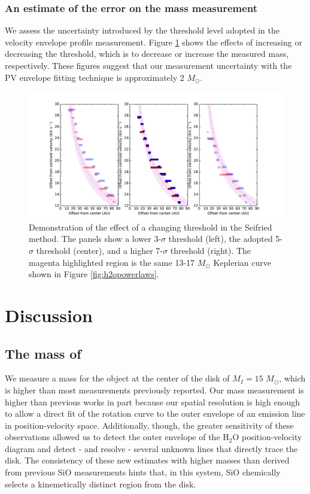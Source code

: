 \documentclass[twocolumn]{aastex61}
\newcommand{\msun}{\ensuremath{M_{\odot}}\xspace}			%
\newcommand{\water}{H$_{2}$O\xspace}		%
\begin{document}
\subsubsection{An estimate of the error on the mass measurement}
\label{sec:errorestimate}
We  assess the uncertainty introduced by the threshold level adopted in the
velocity envelope profile measurement.  Figure \ref{fig:seifreidthresholderror}
shows the effects of increasing or decreasing the threshold, which is to
decrease or increase the measured mass, respectively.  These figures suggest
that our measurement uncertainty with the PV envelope fitting technique  is
approximately 2 \msun.


\begin{figure}[!htp]
\includegraphics[scale=1,width=7.5in]{figures/outerenvelope_velocity_thresholds_H2O_kepler_SeifriedPlot_0.01arcsec.pdf}
\caption{Demonstration of the effect of a changing threshold in the Seifried method.
The panels show a lower 3-$\sigma$ threshold (left), the adopted 5-$\sigma$
threshold (center), and a higher 7-$\sigma$ threshold (right).  
The magenta highlighted region is the same 13-17 \msun Keplerian curve shown
in Figure \ref{fig:h2opowerlaws}.  
}
\label{fig:seifreidthresholderror}
\end{figure}



\section{Discussion}
\label{sec:discussion}
\subsection{The mass of \sourcei}
We measure a mass for the object at the center of the disk of $M_I=15$
\msun, which is higher than most measurements previously reported.  Our mass
measurement is higher than previous works in part because our spatial
resolution is high enough to allow a direct fit of the rotation curve to the
outer envelope of an emission line in position-velocity space.
Additionally, though, the greater sensitivity of these observations allowed
us to detect the outer envelope of the \water position-velocity diagram
and detect - and resolve - several unknown lines that directly trace the disk.
The consistency of these new estimates with higher masses than derived from
previous SiO measurements hints that, in this system, SiO chemically selects a
kinemetically distinct region from the disk.
\end{document}
